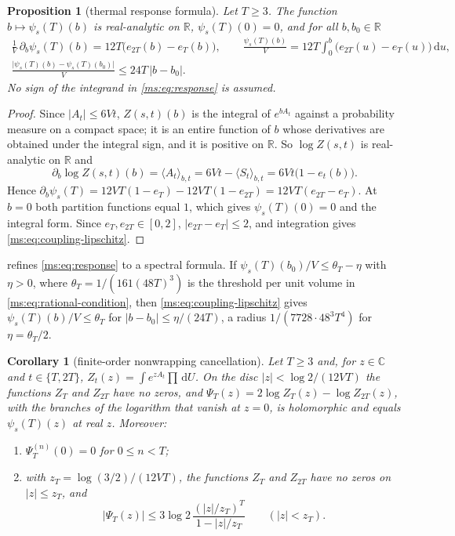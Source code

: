 \documentclass[11pt,a4paper]{amsart}
\newtheorem{proposition}[theorem]{Proposition}
\newtheorem{corollary}[theorem]{Corollary}
\theoremstyle{definition}
\theoremstyle{remark}
\numberwithin{equation}{section}
\newcommand{\R}{\mathbb{R}}          %
\newcommand{\C}{\mathbb{C}}          %
\newcommand{\abs}[1]{\lvert #1\rvert}      %
\newcommand{\dd}{\,\mathrm{d}}             %
\newcommand{\Zpart}[2]{Z(#1,#2)}           %
\newcommand{\psiT}[2]{\psi_{#1}(#2)}       %
\begin{document}
\begin{proposition}[thermal response formula]\label{ms:prop:response}
Let $T\ge3$. The function $b\mapsto\psiT{s}{T}(b)$ is real-analytic on $\R$, $\psiT{s}{T}(0)=0$, and for all $b,b_0\in\R$
\begin{gather}
\frac1V\,\partial_b\psiT{s}{T}(b)=12T\bigl(e_{2T}(b)-e_T(b)\bigr),\qquad \frac{\psiT{s}{T}(b)}{V}=12T\int_0^b\bigl(e_{2T}(u)-e_T(u)\bigr)\dd u,\label{ms:eq:response}\\
\frac{\abs{\psiT{s}{T}(b)-\psiT{s}{T}(b_0)}}{V}\le24T\,\abs{b-b_0}.\label{ms:eq:coupling-lipschitz}
\end{gather}
No sign of the integrand in \eqref{ms:eq:response} is assumed.
\end{proposition}

\begin{proof}
Since $\abs{A_t}\le6Vt$, $\Zpart{s}{t}(b)$ is the integral of $e^{bA_t}$ against a probability measure on a compact space; it is an entire function of $b$ whose derivatives are obtained under the integral sign, and it is positive on $\R$. So $\log\Zpart{s}{t}$ is real-analytic on $\R$ and
\[
\partial_b\log\Zpart{s}{t}(b)=\langle A_t\rangle_{b,t}=6Vt-\langle S_t\rangle_{b,t}=6Vt\bigl(1-e_t(b)\bigr).
\]
Hence $\partial_b\psiT{s}{T}=12VT(1-e_T)-12VT(1-e_{2T})=12VT(e_{2T}-e_T)$. At $b=0$ both partition functions equal $1$, which gives $\psiT{s}{T}(0)=0$ and the integral form. Since $e_T,e_{2T}\in[0,2]$, $\abs{e_{2T}-e_T}\le2$, and integration gives \eqref{ms:eq:coupling-lipschitz}.
\end{proof}

 refines \eqref{ms:eq:response} to a spectral formula. If $\psiT{s}{T}(b_0)/V\le\theta_T-\eta$ with $\eta>0$, where $\theta_T=1/(161(48T)^3)$ is the threshold per unit volume in \eqref{ms:eq:rational-condition}, then \eqref{ms:eq:coupling-lipschitz} gives $\psiT{s}{T}(b)/V\le\theta_T$ for $\abs{b-b_0}\le\eta/(24T)$, a radius $1/(7728\cdot48^3T^4)$ for $\eta=\theta_T/2$.

\begin{corollary}[finite-order nonwrapping cancellation]\label{ms:thm:Haar-cancel}
Let $T\ge3$ and, for $z\in\C$ and $t\in\{T,2T\}$, $Z_t(z)=\int e^{zA_t}\prod\dd U$. On the disc $\abs z<\log2/(12VT)$ the functions $Z_T$ and $Z_{2T}$ have no zeros, and $\Psi_T(z)=2\log Z_T(z)-\log Z_{2T}(z)$, with the branches of the logarithm that vanish at $z=0$, is holomorphic and equals $\psiT{s}{T}(z)$ at real $z$. Moreover:
\begin{enumerate}[label=(\alph*)]
\item $\Psi_T^{(n)}(0)=0$ for $0\le n<T$;
\item with $z_T=\log(3/2)/(12VT)$, the functions $Z_T$ and $Z_{2T}$ have no zeros on $\abs z\le z_T$, and
\[
\abs{\Psi_T(z)}\le3\log2\,\frac{(\abs z/z_T)^T}{1-\abs z/z_T}\qquad(\abs z<z_T).
\]
\end{enumerate}
\end{corollary}
\end{document}
